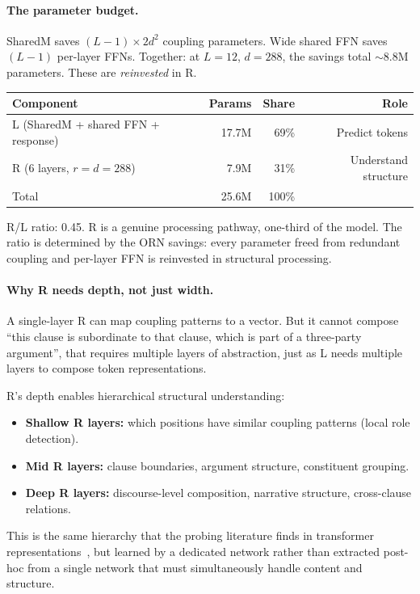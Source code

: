 \documentclass[11pt, a4paper]{article}
\theoremstyle{plain}
\theoremstyle{definition}
\theoremstyle{remark}
\begin{document}
\paragraph{The parameter budget.}
SharedM saves $(L{-}1) \times 2d^2$ coupling parameters.
Wide shared FFN saves $(L{-}1)$ per-layer FFNs.
Together: at $L = 12$, $d = 288$, the savings total $\sim$8.8M parameters.
These are \emph{reinvested} in R.

\begin{center}\small
\begin{tabular}{lrrr}
\toprule
\textbf{Component} & \textbf{Params} & \textbf{Share} & \textbf{Role} \\
\midrule
L (SharedM + shared FFN + response) & 17.7M & 69\% & Predict tokens \\
R (6 layers, $r = d = 288$) & 7.9M & 31\% & Understand structure \\
\midrule
Total & 25.6M & 100\% & \\
\bottomrule
\end{tabular}
\end{center}

\noindent R/L ratio: 0.45.
R is a genuine processing pathway, one-third of the model.
The ratio is determined by the ORN savings: every parameter freed from redundant coupling and per-layer FFN is reinvested in structural processing.

\paragraph{Why R needs depth, not just width.}
A single-layer R can map coupling patterns to a vector.
But it cannot compose ``this clause is subordinate to that clause, which is part of a three-party argument'', that requires multiple layers of abstraction, just as L needs multiple layers to compose token representations.

R's depth enables hierarchical structural understanding:
\begin{itemize}[nosep]
\item \textbf{Shallow R layers:} which positions have similar coupling patterns (local role detection).
\item \textbf{Mid R layers:} clause boundaries, argument structure, constituent grouping.
\item \textbf{Deep R layers:} discourse-level composition, narrative structure, cross-clause relations.
\end{itemize}

This is the same hierarchy that the probing literature finds in transformer representations~\cite{hewitt2019structural}, but learned by a dedicated network rather than extracted post-hoc from a single network that must simultaneously handle content and structure.
\end{document}
